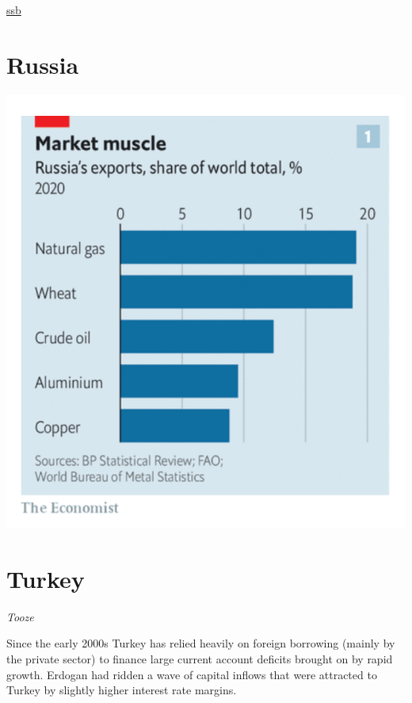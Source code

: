 \documentclass[
]{book}
\begin{document}
\href{https://www.ssb.no/statbank/table/09288/chartViewLine/}{ssb}

\hypertarget{russia}{%
\section{Russia}\label{russia}}

\includegraphics{fig/russia_share_of_world_exports.png}

\hypertarget{turkey}{%
\section{Turkey}\label{turkey}}

\emph{Tooze}

Since the early 2000s Turkey has relied heavily on foreign borrowing (mainly by the private sector) to finance large current account deficits brought on by rapid growth.
Erdogan had ridden a wave of capital inflows that were attracted to Turkey by slightly higher interest rate margins.
\end{document}
